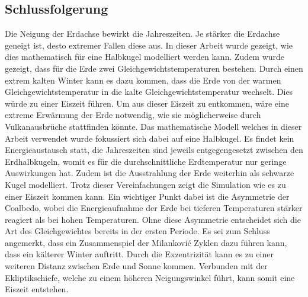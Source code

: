 \begin{refsection}
\section{Schlussfolgerung} \label{sec:schluss} 
Die Neigung der Erdachse bewirkt die Jahreszeiten. Je stärker die Erdachse geneigt ist, desto extremer Fallen diese aus. In dieser Arbeit wurde gezeigt, wie dies mathematisch für eine Halbkugel modelliert werden kann. Zudem wurde gezeigt, dass für die Erde zwei Gleichgewichtstemperaturen bestehen. Durch einen extrem kalten Winter kann es dazu kommen, dass die Erde von der warmen Gleichgewichtstemperatur in die kalte Gleichgewichtstemperatur wechselt. Dies würde zu einer Eiszeit führen. Um aus dieser Eiszeit zu entkommen, wäre eine extreme Erwärmung der Erde notwendig, wie sie möglicherweise durch Vulkanausbrüche stattfinden könnte. 
Das mathematische Modell welches in dieser Arbeit verwendet wurde fokussiert sich dabei auf eine Halbkugel. Es findet kein Energieaustausch statt, die Jahreszeiten sind jeweils entgegengesetzt zwischen den Erdhalbkugeln, womit es für die durchschnittliche Erdtemperatur nur geringe Auswirkungen hat. Zudem ist die Ausstrahlung der Erde weiterhin als schwarze Kugel modelliert. 
Trotz dieser Vereinfachungen zeigt die Simulation wie es zu einer Eiszeit kommen kann. Ein wichtiger Punkt dabei ist die Asymmetrie der Coalbedo, wobei die Energieaufnahme der Erde bei tieferen Temperaturen stärker reagiert als bei hohen Temperaturen. Ohne diese Asymmetrie entscheidet sich die Art des Gleichgewichtes bereits in der ersten Periode. 
Es sei zum Schluss angemerkt, dass ein Zusammenspiel der Milankovi\'c Zyklen dazu führen kann, dass ein kälterer Winter auftritt. Durch die Exzentrizität kann es zu einer weiteren Distanz zwischen Erde und Sonne kommen. Verbunden mit der Ekliptikschiefe, welche zu einem höheren Neigungswinkel führt, kann somit eine Eiszeit entstehen. 


\printbibliography[heading=subbibliography]
\end{refsection}
